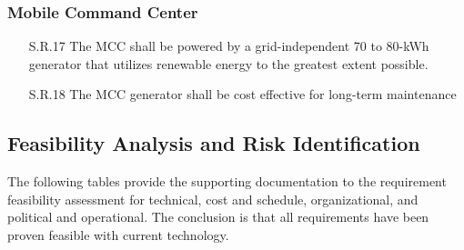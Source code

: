 \begin{fullwidth}
    \subsubsection*{Mobile Command Center}
    \begin{enumerate}
        \item[S.R.17]{The MCC shall be powered by a grid-independent 70 to 80-kWh generator that utilizes renewable energy to the greatest extent possible.}
        \item[S.R.18]{The MCC generator shall be cost effective for long-term maintenance}
    \end{enumerate}

\subsection{Feasibility Analysis and Risk Identification}
    The following tables provide the supporting documentation to the requirement feasibility assessment for technical, cost and schedule, organizational, and political and operational. The conclusion is that all requirements have been proven feasible with current technology.
    
    \begin{landscape}
    
    
    
        

\end{landscape}
\end{fullwidth}
